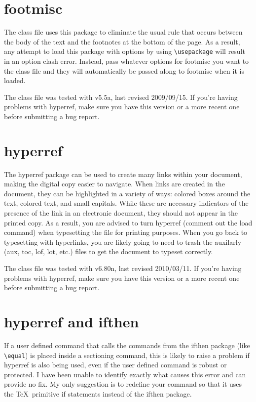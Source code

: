 \section{footmisc}
The class file uses this package to eliminate the usual rule that occurs between the body of the text and the footnotes at the bottom of the page.  As a result, any attempt to load this package with options by using \verb=\usepackage= will result in an option clash error.  Instead, pass whatever options for footmisc you want to the class file and they will automatically be passed along to footmisc when it is loaded.

The class file was tested with v5.5a, last revised 2009/09/15.  If you're having problems with hyperref, make sure you have this version or a more recent one before submitting a bug report.

\section{hyperref}
The hyperref package can be used to create many links within your document, making the digital copy easier to navigate.  When links are created in the document, they can be highlighted in a variety of ways: colored boxes around the text, colored text, and small capitals.  While these are necessary indicators of the presence of the link in an electronic document, they should not appear in the printed copy.  As a result, you are advised to turn hyperref (comment out the load command) when typesetting the file for printing purposes.  When you go back to typesetting with hyperlinks, you are likely going to need to trash the auxilarly (aux, toc, lof, lot, etc.) files to get the document to typeset correctly.

The class file was tested with v6.80n, last revised 2010/03/11.  If you're having problems with hyperref, make sure you have this version or a more recent one before submitting a bug report.

\section{hyperref and ifthen}
If a user defined command that calls the commands from the ifthen package (like \verb=\equal=) is placed inside a sectioning command, this is likely to raise a problem if hyperref is also being used, even if the user defined command is robust or protected.  I have been unable to identify exactly what causes this error and can provide no fix.  My only suggestion is to redefine your command so that it uses the \TeX\ primitive if statements instead of the ifthen package.

